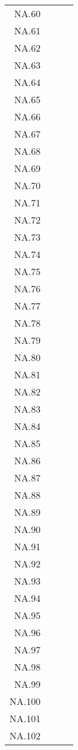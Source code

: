 \begin{table}[ht]
\begin{tabular}{rrrr}
  NA.60 &  &  &  \\ 
  NA.61 &  &  &  \\ 
  NA.62 &  &  &  \\ 
  NA.63 &  &  &  \\ 
  NA.64 &  &  &  \\ 
  NA.65 &  &  &  \\ 
  NA.66 &  &  &  \\ 
  NA.67 &  &  &  \\ 
  NA.68 &  &  &  \\ 
  NA.69 &  &  &  \\ 
  NA.70 &  &  &  \\ 
  NA.71 &  &  &  \\ 
  NA.72 &  &  &  \\ 
  NA.73 &  &  &  \\ 
  NA.74 &  &  &  \\ 
  NA.75 &  &  &  \\ 
  NA.76 &  &  &  \\ 
  NA.77 &  &  &  \\ 
  NA.78 &  &  &  \\ 
  NA.79 &  &  &  \\ 
  NA.80 &  &  &  \\ 
  NA.81 &  &  &  \\ 
  NA.82 &  &  &  \\ 
  NA.83 &  &  &  \\ 
  NA.84 &  &  &  \\ 
  NA.85 &  &  &  \\ 
  NA.86 &  &  &  \\ 
  NA.87 &  &  &  \\ 
  NA.88 &  &  &  \\ 
  NA.89 &  &  &  \\ 
  NA.90 &  &  &  \\ 
  NA.91 &  &  &  \\ 
  NA.92 &  &  &  \\ 
  NA.93 &  &  &  \\ 
  NA.94 &  &  &  \\ 
  NA.95 &  &  &  \\ 
  NA.96 &  &  &  \\ 
  NA.97 &  &  &  \\ 
  NA.98 &  &  &  \\ 
  NA.99 &  &  &  \\ 
  NA.100 &  &  &  \\ 
  NA.101 &  &  &  \\ 
  NA.102 &  &  &  \\ 

\end{tabular}
\end{table}
